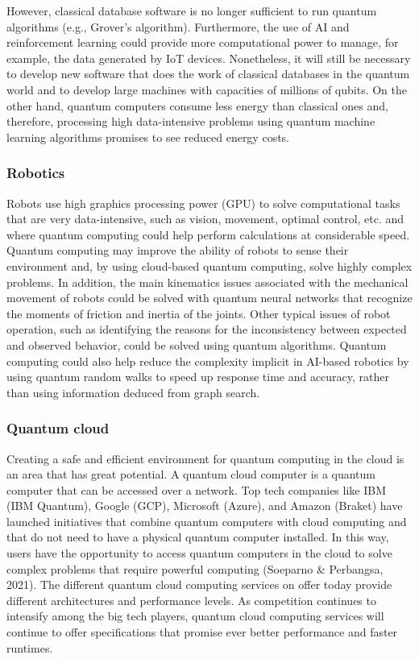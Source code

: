 \documentclass[
  letterpaper,
  DIV=11,
  numbers=noendperiod]{scrreprt}
\begin{document}
However, classical database software is no longer sufficient to run
quantum algorithms (e.g., Grover's algorithm). Furthermore, the use of
AI and reinforcement learning could provide more computational power to
manage, for example, the data generated by IoT devices. Nonetheless, it
will still be necessary to develop new software that does the work of
classical databases in the quantum world and to develop large machines
with capacities of millions of qubits. On the other hand, quantum
computers consume less energy than classical ones and, therefore,
processing high data-intensive problems using quantum machine learning
algorithms promises to see reduced energy costs.

\hypertarget{robotics}{%
\subsubsection{Robotics}\label{robotics}}

Robots use high graphics processing power (GPU) to solve computational
tasks that are very data-intensive, such as vision, movement, optimal
control, etc. and where quantum computing could help perform
calculations at considerable speed. Quantum computing may improve the
ability of robots to sense their environment and, by using cloud-based
quantum computing, solve highly complex problems. In addition, the main
kinematics issues associated with the mechanical movement of robots
could be solved with quantum neural networks that recognize the moments
of friction and inertia of the joints. Other typical issues of robot
operation, such as identifying the reasons for the inconsistency between
expected and observed behavior, could be solved using quantum
algorithms. Quantum computing could also help reduce the complexity
implicit in AI-based robotics by using quantum random walks to speed up
response time and accuracy, rather than using information deduced from
graph search.

\hypertarget{quantum-cloud}{%
\subsubsection{Quantum cloud}\label{quantum-cloud}}

Creating a safe and efficient environment for quantum computing in the
cloud is an area that has great potential. A quantum cloud computer is a
quantum computer that can be accessed over a network. Top tech companies
like IBM (IBM Quantum), Google (GCP), Microsoft (Azure), and Amazon
(Braket) have launched initiatives that combine quantum computers with
cloud computing and that do not need to have a physical quantum computer
installed. In this way, users have the opportunity to access quantum
computers in the cloud to solve complex problems that require powerful
computing (Soeparno \& Perbangsa, 2021). The different quantum cloud
computing services on offer today provide different architectures and
performance levels. As competition continues to intensify among the big
tech players, quantum cloud computing services will continue to offer
specifications that promise ever better performance and faster runtimes.
\end{document}
